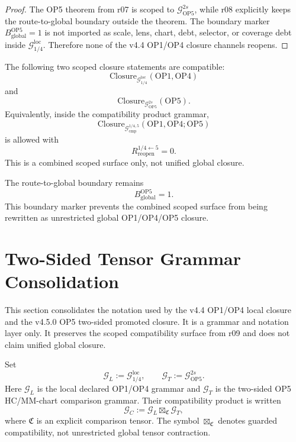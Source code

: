 \begin{proof}
The OP5 theorem from r07 is scoped to
\(\mathcal G_{\mathrm{OP5}}^{2s}\), while r08 explicitly keeps the
route-to-global boundary outside the theorem.  The boundary marker
\(B_{\mathrm{global}}^{\mathrm{OP5}}=1\) is not imported as scale, lens, chart,
debt, selector, or coverage debt inside \(\mathcal G_{1/4}^{\mathrm{loc}}\).
Therefore none of the v4.4 OP1/OP4 closure channels reopens.
\end{proof}

\begin{theorem}
The following two scoped closure statements are compatible:
\[
    \mathrm{Closure}_{\mathcal G_{1/4}^{\mathrm{loc}}}(\mathrm{OP1},\mathrm{OP4})
\]
and
\[
    \mathrm{Closure}_{\mathcal G_{\mathrm{OP5}}^{2s}}(\mathrm{OP5}).
\]
Equivalently, inside the compatibility product grammar,
\[
    \mathrm{Closure}_{\mathcal G_{\mathrm{cmp}}^{1/4,5}}
    (\mathrm{OP1},\mathrm{OP4};\mathrm{OP5})
\]
is allowed with
\[
    R_{\mathrm{reopen}}^{1/4\leftarrow 5}=0.
\]
This is a combined scoped surface only, not unified global closure.
\end{theorem}

\begin{remark}
The route-to-global boundary remains
\[
    B_{\mathrm{global}}^{\mathrm{OP5}}=1.
\]
This boundary marker prevents the combined scoped surface from being rewritten
as unrestricted global OP1/OP4/OP5 closure.
\end{remark}



\section{Two-Sided Tensor Grammar Consolidation}
\label{sec:v450-r10-two-sided-tensor-grammar-consolidation}

This section consolidates the notation used by the v4.4 OP1/OP4 local closure
and the v4.5.0 OP5 two-sided promoted closure.  It is a grammar and notation
layer only.  It preserves the scoped compatibility surface from r09 and does
not claim unified global closure.

\begin{definition}
Set
\[
    \mathcal G_L := \mathcal G_{1/4}^{\mathrm{loc}},
    \qquad
    \mathcal G_T := \mathcal G_{\mathrm{OP5}}^{2s}.
\]
Here \(\mathcal G_L\) is the local declared OP1/OP4 grammar and
\(\mathcal G_T\) is the two-sided OP5 HC/MM-chart comparison grammar.  Their
compatibility product is written
\[
    \mathcal G_C
    :=
    \mathcal G_L \boxtimes_{\mathfrak C} \mathcal G_T,
\]
where \(\mathfrak C\) is an explicit comparison tensor.  The symbol
\(\boxtimes_{\mathfrak C}\) denotes guarded compatibility, not unrestricted
global tensor contraction.
\end{definition}

